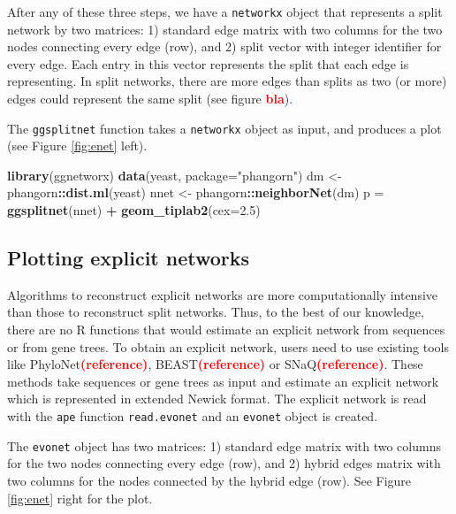 \documentclass[]{article}
\newenvironment{Shaded}{\begin{snugshade}}{\end{snugshade}}
\newcommand{\DataTypeTok}[1]{\textcolor[rgb]{0.13,0.29,0.53}{#1}}
\newcommand{\FloatTok}[1]{\textcolor[rgb]{0.00,0.00,0.81}{#1}}
\newcommand{\KeywordTok}[1]{\textcolor[rgb]{0.13,0.29,0.53}{\textbf{#1}}}
\newcommand{\NormalTok}[1]{#1}
\newcommand{\OperatorTok}[1]{\textcolor[rgb]{0.81,0.36,0.00}{\textbf{#1}}}
\newcommand{\StringTok}[1]{\textcolor[rgb]{0.31,0.60,0.02}{#1}}
\begin{document}
After any of these three steps, we have a \texttt{networkx} object that
represents a split network by two matrices: 1) standard edge matrix with
two columns for the two nodes connecting every edge (row), and 2) split
vector with integer identifier for every edge. Each entry in this vector
represents the split that each edge is representing. In split networks,
there are more edges than splits as two (or more) edges could represent
the same split (see figure \textcolor{red}{\textbf{bla}}).

The \texttt{ggsplitnet} function takes a \texttt{networkx} object as
input, and produces a plot (see Figure \ref{fig:enet} left).

\begin{Shaded}
\begin{Highlighting}[]
\KeywordTok{library}\NormalTok{(ggnetworx)}
\KeywordTok{data}\NormalTok{(yeast, }\DataTypeTok{package=}\StringTok{"phangorn"}\NormalTok{)}
\NormalTok{dm <-}\StringTok{ }\NormalTok{phangorn}\OperatorTok{::}\KeywordTok{dist.ml}\NormalTok{(yeast) }
\NormalTok{nnet <-}\StringTok{ }\NormalTok{phangorn}\OperatorTok{::}\KeywordTok{neighborNet}\NormalTok{(dm)}
\NormalTok{p =}\StringTok{ }\KeywordTok{ggsplitnet}\NormalTok{(nnet) }\OperatorTok{+}\StringTok{ }\KeywordTok{geom_tiplab2}\NormalTok{(}\DataTypeTok{cex=}\FloatTok{2.5}\NormalTok{)}
\end{Highlighting}
\end{Shaded}

\hypertarget{plotting-explicit-networks}{%
\subsection{Plotting explicit
networks}\label{plotting-explicit-networks}}

Algorithms to reconstruct explicit networks are more computationally
intensive than those to reconstruct split networks. Thus, to the best of
our knowledge, there are no R functions that would estimate an explicit
network from sequences or from gene trees. To obtain an explicit
network, users need to use existing tools like
PhyloNet\textcolor{red}{\textbf{(reference)}},
BEAST\textcolor{red}{\textbf{(reference)}} or
SNaQ\textcolor{red}{\textbf{(reference)}}. These methods take sequences
or gene trees as input and estimate an explicit network which is
represented in extended Newick format. The explicit network is read with
the \texttt{ape} function \texttt{read.evonet} and an \texttt{evonet}
object is created.

The \texttt{evonet} object has two matrices: 1) standard edge matrix
with two columns for the two nodes connecting every edge (row), and 2)
hybrid edges matrix with two columns for the nodes connected by the
hybrid edge (row). See Figure \ref{fig:enet} right for the plot.
\end{document}
